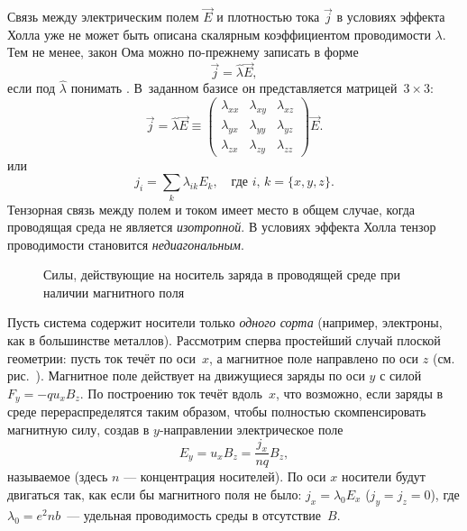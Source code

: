 
Связь между электрическим полем $\vec{E}$ и плотностью тока $\vec{j}$ в
условиях эффекта Холла уже не может быть описана скалярным коэффициентом проводимости
$\lambda$. Тем не менее, закон Ома можно по-прежнему записать
в форме
\begin{equation}
\vec{j} = \hat{\lambda} \vec{E},
\end{equation}
если под $\hat{\lambda}$
понимать . В~заданном базисе он представляется
матрицей~$3\times 3$:
\begin{equation}
    \vec{j} =\hat{\lambda}\vec{E}\equiv \left(
    \begin{matrix}
     \lambda_{xx} & \lambda_{xy} & \lambda_{xz}\\
     \lambda_{yx} & \lambda_{yy} & \lambda_{yz}\\
     \lambda_{zx} & \lambda_{zy} & \lambda_{zz}
    \end{matrix}
\right) \vec{E}.
\end{equation}
или
\begin{equation*}
    j_{i} = \sum_{k} \lambda_{ik} E_k,\quad \text{где~}i,\,k=\{x,y,z\}.
\end{equation*}
Тензорная связь между полем и током имеет место в общем случае, когда
проводящая среда не является \emph{изотропной}.
В условиях эффекта Холла тензор проводимости становится \emph{недиагональным}.


\begin{wrapfigure}{o}{0.5\textwidth}
\centering
    \caption{Силы, действующие на носитель заряда в проводящей среде
    при наличии магнитного поля}
\end{wrapfigure}

Пусть система содержит носители только \emph{одного сорта}
(например, электроны, как в большинстве металлов).
Рассмотрим сперва простейший случай плоской геометрии:
пусть ток течёт по оси~$x$, а магнитное поле направлено по оси $z$
(см. рис.~).
Магнитное поле действует на движущиеся заряды по оси $y$ с силой $F_y=-qu_xB_z$.
По построению ток течёт вдоль~$x$, что возможно,
если заряды в среде перераспределятся таким образом, чтобы полностью
скомпенсировать магнитную силу, создав в $y$-направлении электрическое поле
\begin{equation*}
E_y=u_x B_z=\frac{j_x}{nq} B_z,
\end{equation*}
называемое  (здесь $n$ --- концентрация носителей).
По оси $x$ носители будут двигаться так, как если бы магнитного поля не было:
$j_x=\lambda_0 E_x$ ($j_y=j_z=0$), где $\lambda_0 = e^2nb$~---
удельная проводимость среды в отсутствие~$B$.


